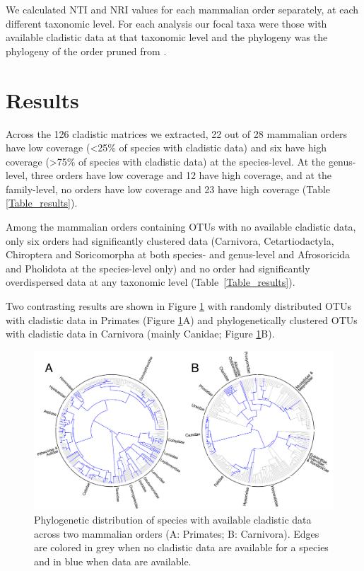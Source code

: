 We calculated NTI and NRI values for each mammalian order separately, at each different taxonomic level. 
For each analysis our focal taxa were those with available cladistic data at that taxonomic level and the phylogeny was the phylogeny of the order pruned from \citep{BinindaEmonds}.

%
%

\section{Results}
Across the 126 cladistic matrices we extracted, 22 out of 28 mammalian orders have low coverage (\textless 25\% of species with cladistic data) and six have high coverage (\textgreater 75\% of species with cladistic data) at the species-level.
At the genus-level, three orders have low coverage and 12 have high coverage, and at the family-level, no orders have low coverage and 23 have high coverage (Table \ref{Table_results}).



Among the mammalian orders containing OTUs with no available cladistic data, only six orders had significantly clustered data (Carnivora, Cetartiodactyla, Chiroptera and Soricomorpha at both species- and genus-level and Afrosoricida and Pholidota at the species-level only) and no order had significantly overdispersed data at any taxonomic level (Table~\ref{Table_results}).

Two contrasting results are shown in Figure \ref{Figure_example_coverage} with randomly distributed OTUs with cladistic data in Primates (Figure \ref{Figure_example_coverage}A) and phylogenetically clustered OTUs with cladistic data in Carnivora (mainly Canidae; Figure \ref{Figure_example_coverage}B).

\begin{figure}[!h]
\centering
    \includegraphics[width=1\textwidth]{Missing_mammals/Figures/example_coverage.pdf}
\caption[Phylogenetic distribution of species with available cladistic data across Primates and Carnivora]{Phylogenetic distribution of species with available cladistic data across two mammalian orders (A: Primates; B: Carnivora).
Edges are colored in grey when no cladistic data are available for a species and in blue when data are available.}
\label{Figure_example_coverage}
\end{figure}

